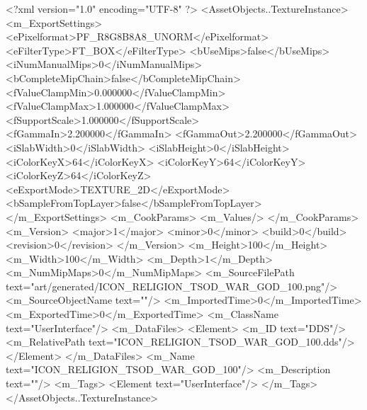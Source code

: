 <?xml version="1.0" encoding="UTF-8" ?>
<AssetObjects..TextureInstance>
	<m_ExportSettings>
		<ePixelformat>PF_R8G8B8A8_UNORM</ePixelformat>
		<eFilterType>FT_BOX</eFilterType>
		<bUseMips>false</bUseMips>
		<iNumManualMips>0</iNumManualMips>
		<bCompleteMipChain>false</bCompleteMipChain>
		<fValueClampMin>0.000000</fValueClampMin>
		<fValueClampMax>1.000000</fValueClampMax>
		<fSupportScale>1.000000</fSupportScale>
		<fGammaIn>2.200000</fGammaIn>
		<fGammaOut>2.200000</fGammaOut>
		<iSlabWidth>0</iSlabWidth>
		<iSlabHeight>0</iSlabHeight>
		<iColorKeyX>64</iColorKeyX>
		<iColorKeyY>64</iColorKeyY>
		<iColorKeyZ>64</iColorKeyZ>
		<eExportMode>TEXTURE_2D</eExportMode>
		<bSampleFromTopLayer>false</bSampleFromTopLayer>
	</m_ExportSettings>
	<m_CookParams>
		<m_Values/>
	</m_CookParams>
	<m_Version>
		<major>1</major>
		<minor>0</minor>
		<build>0</build>
		<revision>0</revision>
	</m_Version>
	<m_Height>100</m_Height>
	<m_Width>100</m_Width>
	<m_Depth>1</m_Depth>
	<m_NumMipMaps>0</m_NumMipMaps>
	<m_SourceFilePath text="art/generated/ICON_RELIGION_TSOD_WAR_GOD_100.png"/>
	<m_SourceObjectName text=""/>
	<m_ImportedTime>0</m_ImportedTime>
	<m_ExportedTime>0</m_ExportedTime>
	<m_ClassName text="UserInterface"/>
	<m_DataFiles>
		<Element>
			<m_ID text="DDS"/>
			<m_RelativePath text="ICON_RELIGION_TSOD_WAR_GOD_100.dds"/>
		</Element>
	</m_DataFiles>
	<m_Name text="ICON_RELIGION_TSOD_WAR_GOD_100"/>
	<m_Description text=""/>
	<m_Tags>
		<Element text="UserInterface"/>
	</m_Tags>
</AssetObjects..TextureInstance>
